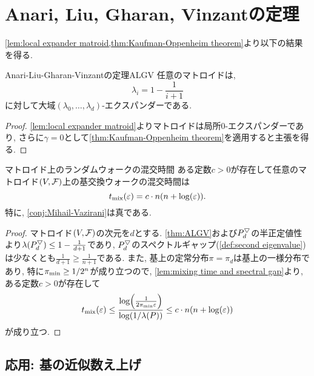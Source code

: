 \section{Anari, Liu, Gharan, Vinzantの定理}
\cref{lem:local expander matroid,thm:Kaufman-Oppenheim theorem}より以下の結果を得る.
\begin{theorem}{Anari-Liu-Gharan-Vinzantの定理}{ALGV}
    任意のマトロイドは,
    \[ \lambda_i = 1-\frac{1}{i+1}\]
    に対して大域$(\lambda_0,\dots,\lambda_d)$-エクスパンダーである.
\end{theorem}
\begin{proof}
    \cref{lem:local expander matroid}よりマトロイドは局所$0$-エクスパンダーであり, さらに$\gamma=0$として\cref{thm:Kaufman-Oppenheim theorem}を適用すると主張を得る.
\end{proof}
\begin{corollary}{マトロイド上のランダムウォークの混交時間}{}
    ある定数$c>0$が存在して任意のマトロイド$(V,\mathcal{F})$上の基交換ウォークの混交時間は
    \[
        t_{\mathrm{mix}}(\varepsilon) = c\cdot n(n+\log(\varepsilon)).
    \]
    特に, \cref{conj:Mihail-Vazirani}は真である.
\end{corollary}
\begin{proof}
    マトロイド$(V,\mathcal{F})$の次元を$d$とする.
    \cref{thm:ALGV}および$P^{\bigtriangledown}_d$の半正定値性より$\lambda(P^{\bigtriangledown}_d) \le 1-\frac{1}{d+1}$であり, $P^{\bigtriangledown}_d$のスペクトルギャップ(\cref{def:second eigenvalue})は少なくとも$\frac{1}{d+1} \ge \frac{1}{n+1}$である.
    また, 基上の定常分布$\pi=\pi_d$は基上の一様分布であり, 特に$\pi_{\min} \ge 1/2^n$が成り立つので, \cref{lem:mixing time and spectral gap}より, ある定数$c>0$が存在して
    \[
        \tmix(\varepsilon) \le \frac{\log\rbra*{\frac{1}{2\pimin\varepsilon}}}{\log(1/\lambda(P))} \le c\cdot  n(n+\log(\varepsilon))
    \]
    が成り立つ.
\end{proof}

\subsection{応用: 基の近似数え上げ}


